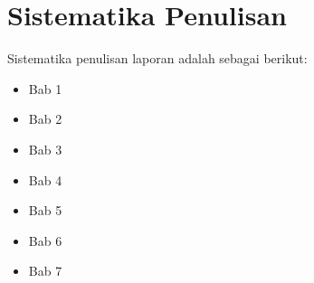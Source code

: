 \section{Sistematika Penulisan}
Sistematika penulisan laporan adalah sebagai berikut:
\begin{itemize}
	\item Bab 1 \babSatu \\
	\item Bab 2 \babDua \\
	\item Bab 3 \babTiga \\
	\item Bab 4 \babEmpat \\
	\item Bab 5 \babLima \\
	\item Bab 6 \babEnam \\
	\item Bab 7 \kesimpulan \\
\end{itemize}


